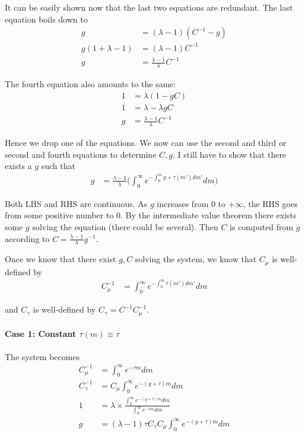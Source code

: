 \documentclass[12pt,english]{article}
\theoremstyle{remark}
\begin{document}
It can be easily shown now that the last two equations are redundant. The last equation boils down to 
\begin{align*}
	g &= (\lambda -1) (C^{-1} - g) \\
	g (1 + \lambda - 1) &= (\lambda -1) C^{-1} \\ 
	g &= \frac{\lambda -1}{\lambda} C^{-1}  
\end{align*}

The fourth equation also amounts to the same:
\begin{align*}
	1 &= \lambda(1 - gC) \\
	1 &= \lambda - \lambda g C\\
	g &= \frac{\lambda -1}{\lambda } C^{-1}
\end{align*}

Hence we drop one of the equations. We now can use the second and third or second and fourth equations to determine $C,g$. I still have to show that there exists a $g$ such that
\begin{align*}
	g &= \frac{\lambda -1}{\lambda} \Big( \int_{0}^{\infty} e^{-\int_0^m g + \tau(m') dm'} dm  \Big)
\end{align*}

Both LHS and RHS are continuous. As $g$ increases from $0$ to $+\infty$, the RHS goes from some positive number to 0. By the intermediate value theorem there exists some $g$ solving the equation (there could be several). Then $C$ is computed from $g$ according to $C = \frac{\lambda - 1}{\lambda} g^{-1}$. 

Once we know that there exist $g,C$ solving the system, we know that $C_{\mu}$ is well-defined by 
\begin{align*}
	C_{\mu}^{-1} &=\int_0^{\infty} e^{-\int_0^m \tau(m')dm'} dm
\end{align*}

and $C_{\gamma}$ is well-defined by $C_{\gamma} = C^{-1} C_{\mu}^{-1}$. 

\paragraph{Case 1: Constant $\tau(m) \equiv \tau$}

The system becomes
\begin{align*}
	C_{\mu}^{-1} &= \int_{0}^{\infty} e^{-\tau m} dm \\
	C_{\gamma}^{-1} &= C_{\mu} \int_{0}^{\infty} e^{-(g+\tau)m}  dm \\
	1 &= \lambda \times  \frac{ \int_{0}^{\infty} e^{-(g+\tau)m} dm}{\int_{0}^{\infty} e^{-\tau m}dm} \\
	g &= (\lambda -1) \tau C_{\gamma} C_{\mu} \int_{0}^{\infty} e^{-(g+\tau)m} dm
\end{align*}
\end{document}
